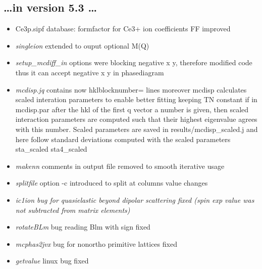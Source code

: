 \documentclass[twoside]{article}
\newcommand{\prg}{\sl}
\begin{document}
\subsection*{ \dots in version 5.3 \dots}
\begin{itemize}
\item  Ce3p.sipf database: formfactor for Ce3+ ion coefficients FF improved 
\item {\prg singleion} extended to ouput optional M(Q)
\item {\prg setup\_mcdiff\_in}  options were blocking negative x y, therefore modified code
           thus it can accept negative x y in phasediagram
\item {\prg mcdisp.jq } contains now hklblocknumber= lines 
 moreover mcdisp calculates scaled interation parameters to enable better fitting keeping TN constant
if in mcdisp.par after the hkl of the first q vector a number is given, then
scaled interaction parameters are computed such that their highest eigenvalue
agrees with this number. Scaled parameters are saved in results/mcdisp\_scaled.j
and here follow standard deviations computed with the scaled parameters
 sta\_scaled sta4\_scaled
\item {\prg makenn} comments in output file removed to smooth iterative usage
\item {\prg splitfile} option -c introduced to split at columns value changes
\item {\prg  ic1ion bug for quasielastic beyond dipolar scattering fixed (spin exp value was not
          subtracted from matrix elements)}
\item {\prg rotateBLm} bug reading Blm with sign  fixed
\item {\prg mcphas2jvx} bug for nonortho primitive lattices fixed
\item {\prg getvalue} linux bug fixed
\end{itemize}
\end{document}
